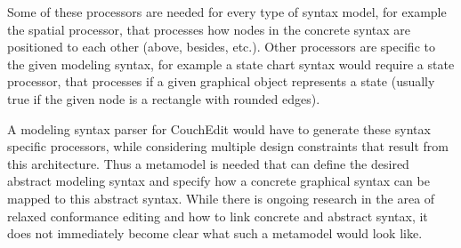 \documentclass[10pt,a4paper,oneside]{scrartcl}
\begin{document}
Some of these processors are needed for every type of syntax model, for example the spatial processor, that processes how nodes in the concrete syntax are positioned to each other (above, besides, etc.). Other processors are specific to the given modeling syntax, for example a state chart syntax would require a state processor, that processes if a given graphical object represents a state (usually true if the given node is a rectangle with rounded edges).

A modeling syntax parser for CouchEdit would have to generate these syntax specific processors, while considering multiple design constraints that result from this architecture. Thus a metamodel is needed that can define the desired abstract modeling syntax and specify how a concrete graphical syntax can be mapped to this abstract syntax. While there is ongoing research in the area of relaxed conformance editing and how to link concrete and abstract syntax, it does not immediately become clear what such a metamodel would look like.







\end{document}

